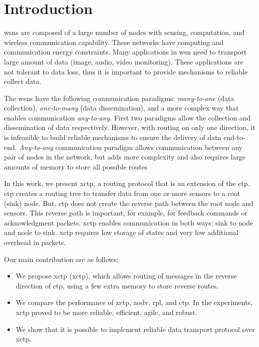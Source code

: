 \section{Introduction}
\label{sec:introduction}


\acp{wsn} are composed of a large number of nodes with sensing,
computation, and wireless communication capability. These networks
have computing and communication energy constraints. Many
applications in \ac{wsn} need to transport large amount of data
(image, audio, video monitoring). These applications are not
tolerant to data loss, thus it is important to provide mechanisms to
reliable collect data.

The \acp{wsn} have the following communication paradigms:
\textit{many-to-one} (data collection), \textit{one-to-many} (data
dissemination), and a more complex way that enables communication
\textit{any-to-any}. First two paradigms allow the collection and
dissemination of data respectively. However, with routing on only
one direction, it is infeasible to build reliable mechanisms to
ensure the delivery of data end-to-end. \textit{Any-to-any}
communication paradigm allows communication between any pair of
nodes in the network, but adds more complexity and also requires
large amounts of memory to store all possible routes

In this work, we present \acf{xctp}, a routing protocol that is an
extension of the \ac{ctp}. \ac{ctp} creates a routing tree to
transfer data from one or more sensors to a root (sink) node. But,
\ac{ctp} does not create the reverse path between the root node and
sensors. This reverse path is important, for example, for feedback
commands or acknowledgment packets. \ac{xctp} enables communication
in both ways: sink to node and node to sink. \ac{xctp} requires low
storage of states and very low additional overhead in packets.

Our main contribution are as follows:
\begin{itemize}
     \item We propose \acl{xctp} (\ac{xctp}), which allows routing of messages in the reverse direction of \ac{ctp}, using a few extra memory to store reverse routes.
     \item We compare the performance of \ac{xctp}, \ac{aodv}, \ac{rpl}, and \ac{ctp}. In the experiments, \ac{xctp} proved to be more reliable, efficient, agile, and robust.
     \item We show that it is possible to implement reliable data transport protocol over \ac{xctp}.
\end{itemize}

